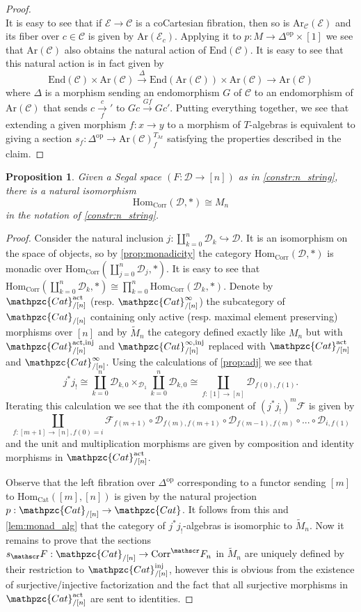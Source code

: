 \documentclass[a4paper, reqno]{amsart}
\newtheorem{prop}[theorem]{Proposition}
\theoremstyle{definition}
\newcommand\cC{\mathscr C}
\newcommand\cD{\mathscr D}
\newcommand\cE{\mathscr E}
\newcommand\cF{\mathscr F}
\newcommand\edm{\mathrm{End}}
\newcommand\mor{\mathrm{Hom}}
\newcommand\inj{\mathrm{inj}}
\newcommand\op{\mathrm{op}}
\newcommand\cat{\mathrm{Cat}}
\newcommand\ccat{\mathpzc{Cat}}
\newcommand\arr{\mathrm{Ar}}
\newcommand\corr{\mathrm{Corr}}
\newcommand\act{\mathrm{act}}
\begin{document}
\begin{proof}
\[\]
It is easy to see that if $\cE\rightarrow\cC$ is a coCartesian fibration, then so is $\arr_\cC(\cE)$ and its fiber over $c\in\cC$ is given by $\arr(\cE_c)$. Applying it to $p:M\rightarrow \Delta^\op\times[1]$ we see that $\arr(\cC)$ also obtains the natural action of $\edm(\cC)$. It is easy to see that this natural action is in fact given by \[\edm(\cC)\times\arr(\cC)\xrightarrow{\Delta}\edm(\arr(\cC))\times\arr(\cC)\rightarrow\arr(\cC)\]
where $\Delta$ is a morphism sending an endomorphism $G$ of $\cC$ to an endomorphism of $\arr(\cC)$ that sends $c\xrightarrow[f]c'$ to $Gc\xrightarrow{Gf}Gc'$. Putting everything together, we see that extending a given morphism $f:x\rightarrow y$ to a morphism of $T$-algebras is equivalent to giving a section $s_f:\Delta^\op\rightarrow \arr(\cC)^{T_\arr}_f$ satisfying the properties described in the claim.
\end{proof}
\begin{prop}\label{prop:nat}
Given a Segal space $(F:\cD\rightarrow[n])$ as in \cref{constr:n_string}, there is a natural isomorphism
\[\mor_\corr(\cD,*)\cong M_n\]
in the notation of \cref{constr:n_string}.
\end{prop}
\begin{proof}
Consider the natural inclusion $j:\coprod_{k=0}^n\cD_k\hookrightarrow \cD$. It is an isomorphism on the space of objects, so by \cref{prop:monadicity} the category $\mor_{\corr}(\cD,*)$ is monadic over $\mor_\corr(\coprod_{j=0}^n\cD_j,*)$. It is easy to see that $\mor_\corr(\coprod_{k=0}^n\cD_k,*)\cong\prod_{k=0}^n\mor_\corr(\cD_k,*)$. Denote by $\ccat^\act_{/[n]}$ (resp. $\ccat^{\infty}_{/[n]}$) the subcategory of $\ccat_{/[n]}$ containing only active (resp. maximal element preserving) morphisms over $[n]$ and by $\widetilde{M}_n$ the category defined exactly like $M_n$ but with $\ccat^{\act,\inj}_{/[n]}$ and $\ccat^{\infty,\inj}_{/[n]}$ replaced with $\ccat^\act_{/[n]}$ and $\ccat^{\infty}_{/[n]}$. Using the calculations of \cref{prop:adj} we see that
\[j^*j_!\cong\coprod_{k=0}^n\cD_{k,0}\times_{\cD_1}\coprod_{k=0}^n\cD_{k,0}\cong\coprod_{f:[1]\rightarrow[n]}\cD_{f(0),f(1)}.\]
Iterating this calculation we see that the $i$th component of $(j^*j_!)^m\cF$ is given by
\[\coprod_{f:[m+1]\rightarrow[n],f(0)=i}\cF_{f(m+1)}\circ\cD_{f(m),f(m+1)}\circ \cD_{f(m-1),f(m)}\circ...\circ \cD_{i, f(1)}\]
and the unit and multiplication morphisms are given by composition and identity morphisms in $\ccat^\act_{/[n]}$.\par
Observe that the left fibration over $\Delta^{\op}$ corresponding to a functor sending $[m]$ to $\mor_\cat([m],[n])$ is given by the natural projection $p:\ccat_{/[n]}\rightarrow\ccat$. It follows from this and \cref{lem:monad_alg} that the category of $j^*j_!$-algebras is isomorphic to $\widetilde{M}_n$. Now it remains to prove that the sections $s_\cF:\ccat_{/[n]}\rightarrow\corr^\cF_n$ in $\widetilde{M}_n$ are uniquely defined by their restriction to $\ccat^{\inj}_{/[n]}$, however this is obvious from the existence of surjective/injective factorization and the fact that all surjective morphisms in $\ccat^\act_{/[n]}$ are sent to identities.
\end{proof}
\end{document}

